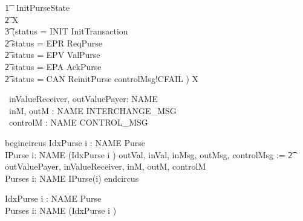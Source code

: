 \documentclass{article}
\begin{document}
\begin{circusaction}
    \t1 \circspot\ \lschexpract InitPurseState \rschexpract \circseq \\
        \t2 \circmu X \circspot\ \\
		\t3 (\lcircguard status = INIT \rcircguard \circguard  InitTransaction  \\
	\t2 \extchoice \lcircguard status = EPR \rcircguard \circguard  ReqPurse  \\
	\t2 \extchoice \lcircguard status = EPV \rcircguard \circguard  ValPurse  \\
	\t2 \extchoice \lcircguard status = EPA \rcircguard \circguard  AckPurse  \\
	\t2 \extchoice \lcircguard status = CAN \rcircguard \circguard \lschexpract ReinitPurse \rschexpract \circseq controlMsg!CFAIL \then \Skip) \circseq X \\	
\end{circusaction}

\begin{circus}
    \circend
\end{circus}

\begin{circus}
     \circchannel\ inValueReceiver, outValuePayer: NAME \cross \nat \\
     \circchannel\ inM, outM : NAME \cross INTERCHANGE\_MSG \\
     \circchannel\ controlM : NAME \cross CONTROL\_MSG
\end{circus}

begin{circus}
      \circprocess IdxPurse \circdef i : NAME \circindex Purse \\
      \circprocess IPurse     \circdef i: NAME \circspot (IdxPurse \lcircindex i \rcircindex)
	\lcircrename outVal, inVal, inMsg, outMsg, controlMsg :=
		\t2 outValuePayer, inValueReceiver, inM, outM, controlM \rcircrename \\
      \circprocess Purses \circdef \Interleave i: NAME \circspot IPurse(i)
end{circus}

\begin{circus}
      \circprocess IdxPurse \circdef i : NAME \circindex Purse
\\
      \circprocess Purses \circdef \Interleave i: NAME \circspot (IdxPurse \lcircindex i \rcircindex)
\end{circus}
\end{document}
